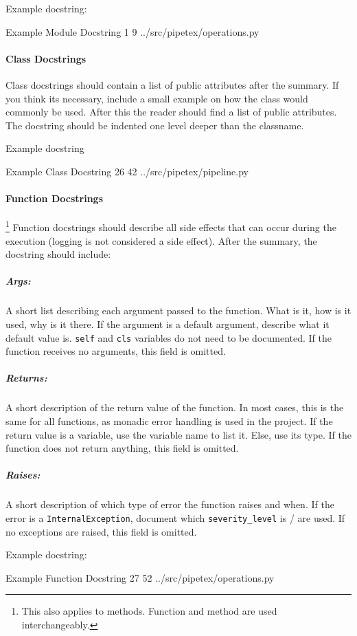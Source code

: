 Example docstring:

\codeexample
{Example Module Docstring}
{1}
{9}
{../src/pipetex/operations.py}

\paragraph{Class Docstrings} Class docstrings should contain a list of public
attributes after the summary. If you think its necessary, include a small 
example on how the class would commonly be used. After this the reader should
find a list of public attributes. The docstring should be indented one level
deeper than the classname.

Example docstring

\codeexample
{Example Class Docstring}
{26}
{42}
{../src/pipetex/pipeline.py}

\newpage

\paragraph{Function Docstrings}\footnote{This also applies to methods. Function
and method are used interchangeably.} Function docstrings should describe all
side effects that can occur during the execution (logging is not considered a
side effect). After the summary, the docstring should include:

\subparagraph{Args:} A short list describing each argument passed to the
function.  What is it, how is it used, why is it there. If the argument is a
default argument, describe what it default value is. \verb|self| and \verb|cls|
variables do not need to be documented. If the function receives no arguments,
this field is omitted.

\subparagraph{Returns:} A short description of the return value of the
function.  In most cases, this is the same for all functions, as monadic error
handling is used in the project. If the return value is a variable, use the
variable name to list it. Else, use its type. If the function does not return
anything, this field is omitted.

\newpage

\subparagraph{Raises:} A short description of which type of error the function
raises and when. If the error is a \verb|InternalException|, document which
\verb|severity_level| is / are used. If no exceptions are raised, this field is
omitted.

Example docstring:

\codeexample
{Example Function Docstring}
{27}
{52}
{../src/pipetex/operations.py}

